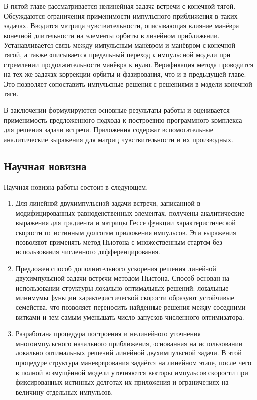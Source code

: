 В пятой главе рассматривается нелинейная задача встречи с конечной тягой. Обсуждаются ограничения применимости импульсного приближения в таких задачах. Вводится матрица чувствительности, описывающая влияние манёвра конечной длительности на элементы орбиты в линейном приближении. Устанавливается связь между импульсным манёвром и манёвром с конечной тягой, а также описывается предельный переход к импульсной модели при стремлении продолжительности манёвра к нулю. Верификация метода проводится на тех же задачах коррекции орбиты и фазирования, что и в предыдущей главе. Это позволяет сопоставить импульсные решения с решениями в модели конечной тяги.

В заключении формулируются основные результаты работы и оценивается применимость предложенного подхода к построению программного комплекса для решения задачи встречи. Приложения содержат вспомогательные аналитические выражения для матриц чувствительности и их производных.

\subsection{Научная новизна}

Научная новизна работы состоит в следующем.
\begin{enumerate}
    \item Для линейной двухимпульсной задачи встречи, записанной в модифицированных равноденственных элементах, получены аналитические выражения для градиента и матрицы Гессе функции характеристической скорости по истинным долготам приложения импульсов. Эти выражения позволяют применять метод Ньютона с множественным стартом без использования численного дифференцирования.
    \item Предложен способ дополнительного ускорения решения линейной двухимпульсной задачи встречи методом Ньютона. Способ основан на использовании структуры локально оптимальных решений: локальные минимумы функции характеристической скорости образуют устойчивые семейства, что позволяет переносить найденные решения между соседними витками и тем самым уменьшать число запусков численного оптимизатора.
    \item Разработана процедура построения и нелинейного уточнения многоимпульсного начального приближения, основанная на использовании локально оптимальных решений линейной двухимпульсной задачи. В этой процедуре структура маневрирования задаётся на линейном этапе, после чего в полной возмущённой модели уточняются векторы импульсов скорости при фиксированных истинных долготах их приложения и ограничениях на величину отдельных импульсов.
\end{enumerate}

